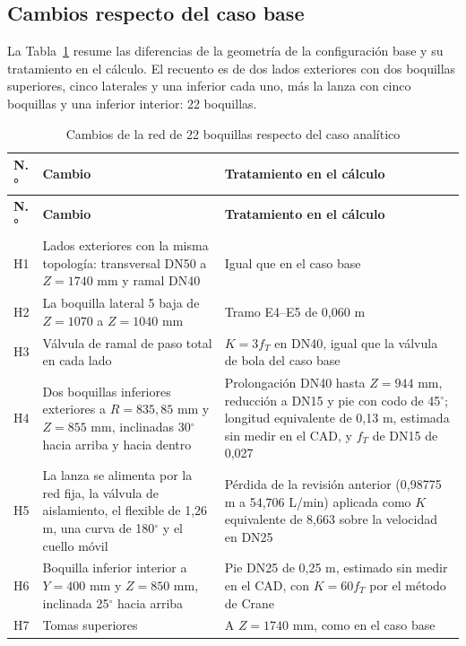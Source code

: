 \subsection{Cambios respecto del caso base}

La Tabla~\ref{tab:red22-cambios} resume las diferencias de la geometría de la configuración base y su tratamiento en el cálculo. El recuento es de dos lados exteriores con dos boquillas superiores, cinco laterales y una inferior cada uno, más la lanza con cinco boquillas y una inferior interior: 22 boquillas.

\begingroup
\small\singlespacing
\setlength{\tabcolsep}{4pt}
\begin{longtable}{@{}p{0.6cm}>{\raggedright\arraybackslash}p{6.2cm}>{\raggedright\arraybackslash}p{\dimexpr\textwidth-6.8cm-4\tabcolsep\relax}@{}}
\caption{Cambios de la red de 22 boquillas respecto del caso analítico}\label{tab:red22-cambios}\\
\toprule
\textbf{N.°} & \textbf{Cambio} & \textbf{Tratamiento en el cálculo}\\
\midrule\endfirsthead
\toprule
\textbf{N.°} & \textbf{Cambio} & \textbf{Tratamiento en el cálculo}\\
\midrule\endhead
\bottomrule\endlastfoot
H1 & Lados exteriores con la misma topología: transversal DN50 a $Z=1740$ mm y ramal DN40 & Igual que en el caso base\\
H2 & La boquilla lateral 5 baja de $Z=1070$ a $Z=1040$ mm & Tramo E4--E5 de 0,060 m\\
H3 & Válvula de ramal de paso total en cada lado & $K=3f_T$ en DN40, igual que la válvula de bola del caso base\\
H4 & Dos boquillas inferiores exteriores a $R=835{,}85$ mm y $Z=855$ mm, inclinadas 30$^\circ$ hacia arriba y hacia dentro & Prolongación DN40 hasta $Z=944$ mm, reducción a DN15 y pie con codo de 45$^\circ$; longitud equivalente de 0,13 m, estimada sin medir en el CAD, y $f_T$ de DN15 de 0,027 \cite{crane410}\\
H5 & La lanza se alimenta por la red fija, la válvula de aislamiento, el flexible de 1,26 m, una curva de 180$^\circ$ y el cuello móvil & Pérdida de la revisión anterior (0,98775 m a 54,706 L/min) aplicada como $K$ equivalente de 8,663 sobre la velocidad en DN25\\
H6 & Boquilla inferior interior a $Y=400$ mm y $Z=850$ mm, inclinada 25$^\circ$ hacia arriba & Pie DN25 de 0,25 m, estimado sin medir en el CAD, con $K=60f_T$ por el método de Crane \cite{crane410}\\
H7 & Tomas superiores & A $Z=1740$ mm, como en el caso base\\
\end{longtable}
\endgroup

